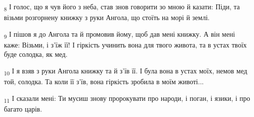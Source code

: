 \begin{tcolorbox}
\textsubscript{8} І голос, що я чув його з неба, став знов говорити зо мною й казати: Піди, та візьми розгорнену книжку з руки Ангола, що стоїть на морі й землі.
\end{tcolorbox}
\begin{tcolorbox}
\textsubscript{9} І пішов я до Ангола та й промовив йому, щоб дав мені книжку. А він мені каже: Візьми, і з'їж її! І гіркість учинить вона для твого живота, та в устах твоїх буде солодка, як мед.
\end{tcolorbox}
\begin{tcolorbox}
\textsubscript{10} І я взяв з руки Ангола книжку та й з'їв її. І була вона в устах моїх, немов мед той, солодка. Та коли її з'їв, вона гіркість зробила в моїм животі...
\end{tcolorbox}
\begin{tcolorbox}
\textsubscript{11} І сказали мені: Ти мусиш знову пророкувати про народи, і поган, і язики, і про багато царів.
\end{tcolorbox}

